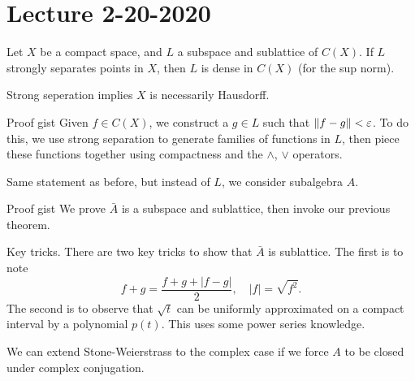 \section{Lecture 2-20-2020}
\begin{thm}
Let $X$ be a compact space, and $L$ a subspace and sublattice of $C(X)$. If $L$ strongly separates points in $X$, then $L$ is dense in $C(X)$ (for the sup norm).
\end{thm}
\begin{remark}
Strong seperation implies $X$ is necessarily Hausdorff.
\end{remark}
\begin{details}{Proof gist}
Given $f \in C(X)$, we construct a $g \in L$ such that $\|f-g\| < \varepsilon$. To do this, we use strong separation to generate families of functions in $L$, then piece these functions together using compactness and the $\wedge$, $\vee$ operators.
\end{details}
\begin{thm}
Same statement as before, but instead of $L$, we consider subalgebra $A$.
\end{thm}
\begin{details}{Proof gist}
We prove $\bar{A}$ is a subspace and sublattice, then invoke our previous theorem.
\end{details}
\begin{details}{Key tricks.}
There are two key tricks to show that $\bar{A}$ is sublattice. The first is to note
\[
    f + g = \frac{f + g + |f-g|}{2}, \quad |f| = \sqrt{f^2}.
\]
The second is to observe that $\sqrt{t}$ can be uniformly approximated on a compact interval by a polynomial $p(t)$. This uses some power series knowledge.
\end{details}
\begin{remark}
We can extend Stone-Weierstrass to the complex case if we force $A$ to be closed under complex conjugation.
\end{remark}
